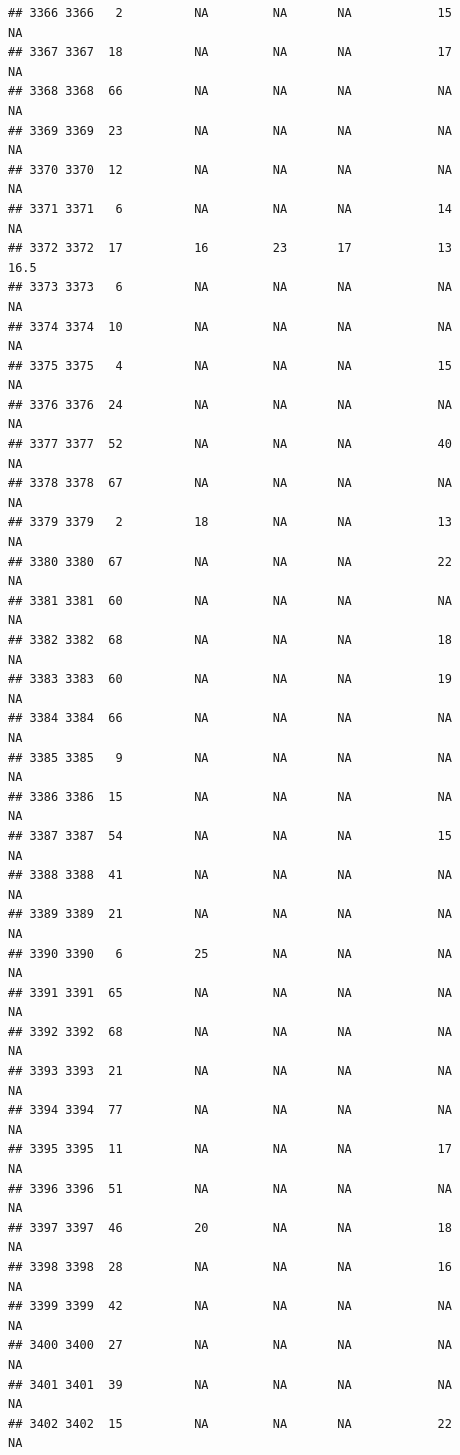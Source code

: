 \documentclass[man]{apa6}
\begin{document}
\begin{verbatim}
## 3366 3366   2          NA         NA       NA            15       NA
## 3367 3367  18          NA         NA       NA            17       NA
## 3368 3368  66          NA         NA       NA            NA       NA
## 3369 3369  23          NA         NA       NA            NA       NA
## 3370 3370  12          NA         NA       NA            NA       NA
## 3371 3371   6          NA         NA       NA            14       NA
## 3372 3372  17          16         23       17            13     16.5
## 3373 3373   6          NA         NA       NA            NA       NA
## 3374 3374  10          NA         NA       NA            NA       NA
## 3375 3375   4          NA         NA       NA            15       NA
## 3376 3376  24          NA         NA       NA            NA       NA
## 3377 3377  52          NA         NA       NA            40       NA
## 3378 3378  67          NA         NA       NA            NA       NA
## 3379 3379   2          18         NA       NA            13       NA
## 3380 3380  67          NA         NA       NA            22       NA
## 3381 3381  60          NA         NA       NA            NA       NA
## 3382 3382  68          NA         NA       NA            18       NA
## 3383 3383  60          NA         NA       NA            19       NA
## 3384 3384  66          NA         NA       NA            NA       NA
## 3385 3385   9          NA         NA       NA            NA       NA
## 3386 3386  15          NA         NA       NA            NA       NA
## 3387 3387  54          NA         NA       NA            15       NA
## 3388 3388  41          NA         NA       NA            NA       NA
## 3389 3389  21          NA         NA       NA            NA       NA
## 3390 3390   6          25         NA       NA            NA       NA
## 3391 3391  65          NA         NA       NA            NA       NA
## 3392 3392  68          NA         NA       NA            NA       NA
## 3393 3393  21          NA         NA       NA            NA       NA
## 3394 3394  77          NA         NA       NA            NA       NA
## 3395 3395  11          NA         NA       NA            17       NA
## 3396 3396  51          NA         NA       NA            NA       NA
## 3397 3397  46          20         NA       NA            18       NA
## 3398 3398  28          NA         NA       NA            16       NA
## 3399 3399  42          NA         NA       NA            NA       NA
## 3400 3400  27          NA         NA       NA            NA       NA
## 3401 3401  39          NA         NA       NA            NA       NA
## 3402 3402  15          NA         NA       NA            22       NA

\end{verbatim}
\end{document}
